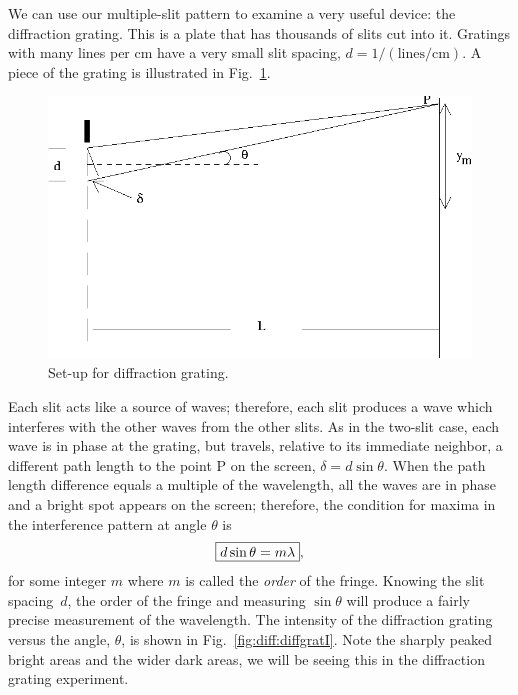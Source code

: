 We can use our multiple-slit pattern to examine a very useful device:
the diffraction grating. This is a plate that has thousands of slits cut into 
it.  Gratings with many lines per cm have a very small slit spacing, $d = 
1/(\mathrm{lines}/\mathrm{cm})$.  A piece of the grating is illustrated in 
Fig.~\ref{fig:diff:grating}.
\begin{figure}[htb]
\centering 
\epsfxsize=6cm \includegraphics[scale=0.6]{10_diffraction/grating.eps}
\caption{Set-up for diffraction grating.}
\label{fig:diff:grating}
\end{figure} 
Each slit acts like a source of waves; therefore, each slit produces a
wave which interferes with the other waves from the other slits.  As in the
two-slit case, each wave is in phase at the grating, but travels,
relative to its immediate neighbor, a different
path length to the point P on the screen, $\delta = d \sin \theta$.  
When the path length difference equals a multiple of the wavelength, all the waves
are in phase and a bright spot appears on the screen; therefore, the 
condition for maxima in the interference pattern at angle $\theta$ is 
\begin{eqnarray}
\fbox{$ \displaystyle d \sin \theta = m \lambda $},
\end{eqnarray}
for some integer $m$ where  
$m$ is called the {\em order} of the fringe. Knowing the slit spacing~$d$, the 
order of the fringe and measuring $\sin \theta$ will produce a fairly precise
measurement of the wavelength.  The intensity of the diffraction grating versus
the angle, $\theta$, is shown in Fig.~\ref{fig:diff:diffgratI}.  Note
the sharply peaked bright areas and the wider dark areas,  we will be seeing
this in the diffraction grating experiment.
